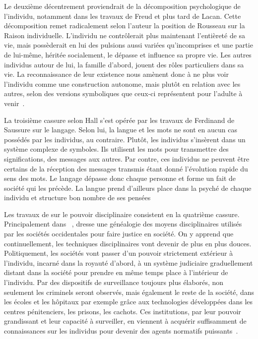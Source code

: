Le deuxième décentrement proviendrait de la décomposition psychologique de l'individu, notamment dans les travaux de Freud et plus tard de Lacan. 
Cette décomposition remet radicalement selon l'auteur la position de Rousseau sur la Raison individuelle. 
L'individu ne contrôlerait plus maintenant l'entièreté de sa vie, mais possèderait en lui des pulsions aussi variées qu'incomprises et une partie de lui-même, héritée socialement, le dépasse et influence sa propre vie. 
Les autres individus autour de lui, la famille d'abord, jouent des rôles particuliers dans sa vie.
La reconnaissance de leur existence nous amènent donc à ne plus voir l'individu comme une construction autonome, mais plutôt en relation avec les autres, selon des versions symboliques que ceux-ci représentent pour l'adulte à venir~\citeyearpar[ 607--608]{Hall1996a}.

La troisième cassure selon Hall s'est opérée par les travaux de Ferdinand de Saussure sur le langage. 
Selon lui, la langue et les mots ne sont en aucun cas possédés par les individus, au contraire. 
Plutôt, les individus s'insèrent dans un système complexe de symboles. 
Ils utilisent les mots pour transmettre des significations, des messages aux autres. 
Par contre, ces individus ne peuvent être certains de la réception des messages transmis étant donné l'évolution rapide du sens des mots. 
Le langage dépasse donc chaque personne et forme un fait de société qui les précède. 
La langue prend d'ailleurs place dans la psyché de chaque individu et structure bon nombre de ses pensées~\citeyearpar[608--609]{Hall1996a}

Les travaux de \citeauthor{Foucault2004a} sur le pouvoir disciplinaire consistent en la quatrième cassure. 
Principalement dans ~\citeyearpar{Foucault2004a}, \citeauthor{Foucault2004a} dresse une généalogie des moyens disciplinaires utilisés par les sociétés occidentales pour faire justice en société. 
On y apprend que continuellement, les techniques disciplinaires vont devenir de plus en plus douces.
Politiquement, les sociétés vont passer d'un pouvoir strictement extérieur à l'individu, incarné dans la royauté d'abord, à un système judiciaire graduellement distant dans la société pour prendre en même temps place à l'intérieur de l'individu. 
Par des dispositifs de surveillance toujours plus élaborés, non seulement les criminels seront observés, mais également le reste de la société, dans les écoles et les hôpitaux par exemple grâce aux technologies développées dans les centres pénitenciers, les prisons, les cachots. 
Ces institutions, par leur pouvoir grandissant et leur capacité à surveiller, en viennent à acquérir suffisamment de connaissances sur les individus pour devenir des agents normatifs puissants~\citep[608--609]{Hall1996a}.

